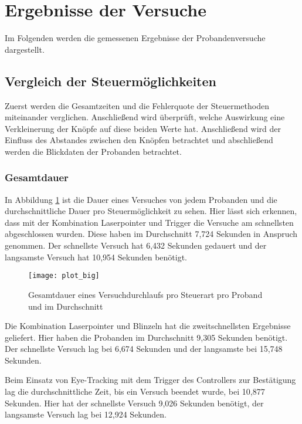 \section{Ergebnisse der Versuche}
Im Folgenden werden die gemessenen Ergebnisse der Probandenversuche dargestellt. 
\subsection{Vergleich der Steuermöglichkeiten}
Zuerst werden die Gesamtzeiten und die Fehlerquote der Steuermethoden miteinander verglichen. Anschließend wird überprüft, welche Auswirkung eine Verkleinerung der Knöpfe auf diese beiden Werte hat. Anschließend wird der Einfluss des Abstandes zwischen den Knöpfen betrachtet und abschließend werden die Blickdaten der Probanden betrachtet.
\subsubsection{Gesamtdauer}
In Abbildung \ref{fig:totalTimesBig} ist die Dauer eines Versuches von jedem Probanden und die durchschnittliche Dauer pro Steuermöglichkeit zu sehen. Hier lässt sich erkennen, dass mit der Kombination Laserpointer und Trigger die Versuche am schnellsten abgeschlossen wurden. Diese haben im Durchschnitt 7,724 Sekunden in Anspruch genommen. Der schnellste Versuch hat 6,432 Sekunden gedauert und der langsamste Versuch hat 10,954 Sekunden benötigt.

\begin{figure}[!htbp]
	\centering
	\texttt{[image: plot\_big]}
	\caption[Gesamtdauer eines Versuchdurchlaufs pro Steuerart pro Proband und im Durchschnitt]{Gesamtdauer eines Versuchdurchlaufs pro Steuerart pro Proband und im Durchschnitt}
	\label{fig:totalTimesBig}
\end{figure}

Die Kombination Laserpointer und Blinzeln hat die zweitschnellsten Ergebnisse geliefert. Hier haben die Probanden im Durchschnitt 9,305 Sekunden benötigt. Der schnellste Versuch lag bei 6,674 Sekunden und der langsamste bei 15,748 Sekunden. 

Beim Einsatz von Eye-Tracking mit dem Trigger des Controllers zur Bestätigung lag die durchschnittliche Zeit, bis ein Versuch beendet wurde, bei 10,877 Sekunden. Hier hat der schnellste Versuch 9,026 Sekunden benötigt, der langsamste Versuch lag bei 12,924 Sekunden.

